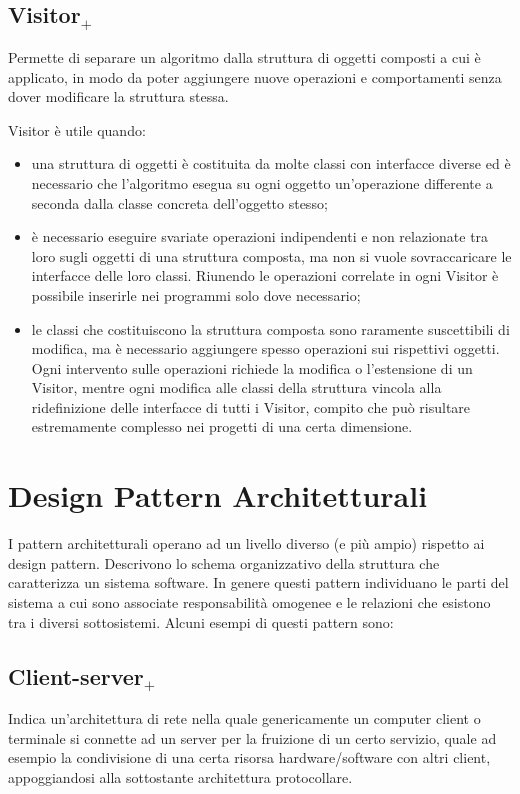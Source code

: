 \subsection{Visitor$_+$}
Permette di separare un algoritmo dalla struttura di oggetti composti a cui è applicato, in modo da poter aggiungere nuove operazioni e comportamenti senza dover modificare la struttura stessa.

Visitor è utile quando:
\begin{itemize}
	\item una struttura di oggetti è costituita da molte classi con interfacce diverse ed è necessario che l'algoritmo esegua su ogni oggetto un'operazione differente a seconda dalla classe concreta dell'oggetto stesso;
	\item è necessario eseguire svariate operazioni indipendenti e non relazionate tra loro sugli oggetti di una struttura composta, ma non si vuole sovraccaricare le interfacce delle loro classi. Riunendo le operazioni correlate in ogni Visitor è possibile inserirle nei programmi solo dove necessario;
	\item le classi che costituiscono la struttura composta sono raramente suscettibili di modifica, ma è necessario aggiungere spesso operazioni sui rispettivi oggetti. Ogni intervento sulle operazioni richiede la modifica o l'estensione di un Visitor, mentre ogni modifica alle classi della struttura vincola alla ridefinizione delle interfacce di tutti i Visitor, compito che può risultare estremamente complesso nei progetti di una certa dimensione.
\end{itemize}

\section{Design Pattern Architetturali}
I pattern architetturali operano ad un livello diverso (e più ampio) rispetto ai design pattern. Descrivono lo schema organizzativo della struttura che caratterizza un sistema software.
In genere questi pattern individuano le parti del sistema a cui sono associate responsabilità omogenee e le relazioni che esistono tra i diversi sottosistemi.
Alcuni esempi di questi pattern sono:

\subsection{Client-server$_+$}
Indica un'architettura di rete nella quale genericamente un computer client o terminale si connette ad un server per la fruizione di un certo servizio, quale ad esempio la condivisione di una certa risorsa hardware/software con altri client, appoggiandosi alla sottostante architettura protocollare.

